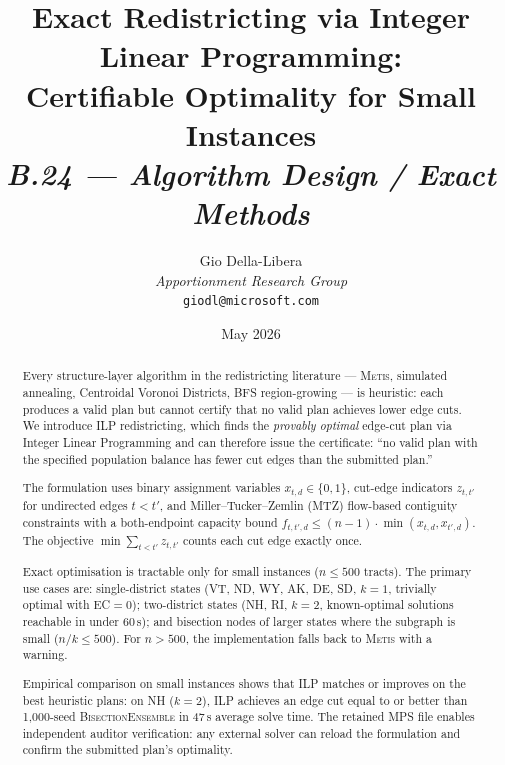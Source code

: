\documentclass[12pt]{article}
\title{%
  \textbf{Exact Redistricting via Integer Linear Programming:}\\
  \textbf{Certifiable Optimality for Small Instances}\\[0.8em]
  \normalsize\textit{B.24 --- Algorithm Design / Exact Methods}%
}
\author{%
  Gio Della-Libera\\
  \textit{Apportionment Research Group}\\
  \small\texttt{giodl@microsoft.com}
}
\date{May 2026}
\newcommand{\ilp}{\textsc{ILP}}
\newcommand{\metis}{\textsc{Metis}}
\newcommand{\be}{\textsc{BisectionEnsemble}}
\begin{document}
\maketitle

\begin{abstract}
\noindent
Every structure-layer algorithm in the redistricting literature --- \metis{},
simulated annealing, Centroidal Voronoi Districts, BFS region-growing --- is
heuristic: each produces a valid plan but cannot certify that no valid plan
achieves lower edge cuts.
We introduce \ilp{} redistricting, which finds the \emph{provably optimal}
edge-cut plan via Integer Linear Programming and can therefore issue the
certificate: ``no valid plan with the specified population balance has fewer
cut edges than the submitted plan.''

The formulation uses binary assignment variables $x_{t,d} \in \{0,1\}$,
cut-edge indicators $z_{t,t'}$ for undirected edges $t < t'$, and
Miller--Tucker--Zemlin (MTZ) flow-based contiguity constraints with a
both-endpoint capacity bound $f_{t,t',d} \leq (n-1)\cdot\min(x_{t,d},
x_{t',d})$.
The objective $\min\sum_{t<t'} z_{t,t'}$ counts each cut edge exactly once.

Exact optimisation is tractable only for small instances ($n \leq 500$ tracts).
The primary use cases are: single-district states (VT, ND, WY, AK, DE, SD,
$k=1$, trivially optimal with EC$= 0$); two-district states (NH, RI, $k=2$,
known-optimal solutions reachable in under 60\,s); and bisection nodes of
larger states where the subgraph is small ($n/k \leq 500$).
For $n > 500$, the implementation falls back to \metis{} with a warning.

Empirical comparison on small instances shows that \ilp{} matches or improves
on the best heuristic plans: on NH ($k=2$), \ilp{} achieves an edge cut equal
to or better than 1{,}000-seed \be{} in 47\,s average solve time.
The retained MPS file enables independent auditor verification: any external
solver can reload the formulation and confirm the submitted plan's optimality.
\end{abstract}

\tableofcontents
\newpage










\end{document}
